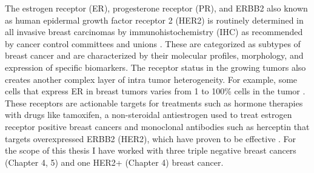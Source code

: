 The estrogen receptor (ER), progesterone receptor (PR), and ERBB2 also known as human epidermal growth factor receptor 2 (HER2) is routinely determined in all invasive breast carcinomas by immunohistochemistry (IHC) as recommended by cancer control committees and unions \cite{turashvili2017tumor, hammond2010college, wolff2013american}. These are categorized as subtypes of breast cancer and are characterized by their molecular profiles, morphology, and expression of specific biomarkers. The receptor status in the growing tumors also creates another complex layer of intra tumor heterogeneity. For example, some cells that express ER in breast tumors varies from 1 to 100\% cells in the tumor \cite{januvskevivciene2019heterogeneity, visvader2011cells}. These receptors are actionable targets for treatments such as hormone therapies with drugs like tamoxifen, a non-steroidal antiestrogen used to treat estrogen receptor positive breast cancers \cite{jordan2003tamoxifen,fisher2005tamoxifen} and monoclonal antibodies such as herceptin that targets overexpressed ERBB2 (HER2), which have proven to be effective \cite{piccart2005trastuzumab,slamon2011adjuvant}.  
For the scope of this thesis I have worked with three triple negative breast cancers (Chapter 4, 5) and one HER2+ (Chapter 4) breast cancer.


